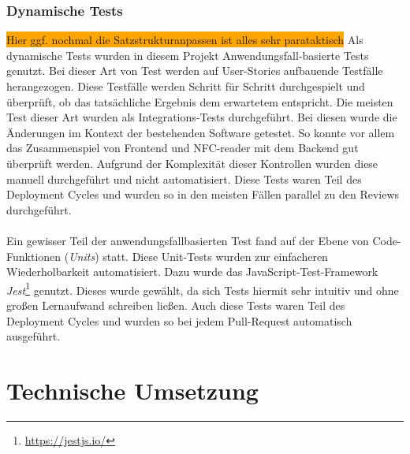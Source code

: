 \documentclass[10pt, a4paper]{article}
\begin{document}
\begin{onehalfspace}
  \subsubsection*{Dynamische Tests}
    \colorbox{orange}{Hier ggf. nochmal die Satzstrukturanpassen ist alles sehr parataktisch}
    Als dynamische Tests wurden in diesem Projekt Anwendungsfall-basierte Tests genutzt.
    Bei dieser Art von Test werden auf User-Stories aufbauende Testfälle herangezogen.
    Diese Testfälle werden Schritt für Schritt \glqq durchgespielt\grqq{} und überprüft, ob das tatsächliche Ergebnis dem erwartetem entspricht.
    Die meisten Test  dieser Art wurden als Integrations-Tests durchgeführt.
    Bei diesen wurde die Änderungen im Kontext der bestehenden Software getestet.
    So konnte vor allem das Zusammenspiel von Frontend und NFC-reader mit dem Backend gut überprüft werden.
    Aufgrund der Komplexität dieser Kontrollen wurden diese manuell durchgeführt und nicht automatisiert.
    Diese Tests waren Teil des Deployment Cycles und wurden so in den meisten Fällen parallel zu den Reviews durchgeführt.
    \\~\\
    Ein gewisser Teil der anwendungsfallbasierten Test fand auf der Ebene von Code-Funktionen (\textit{Units}) statt.
    Diese Unit-Tests wurden zur einfacheren Wiederholbarkeit automatisiert.
    Dazu wurde das JavaScript-Test-Framework \textit{Jest}\footnote{\raggedright\url{https://jestjs.io/}} genutzt.
    Dieses wurde gewählt, da sich Tests hiermit sehr intuitiv und ohne großen Lernaufwand schreiben ließen.
    Auch diese Tests waren Teil des Deployment Cycles und wurden so bei jedem Pull-Request automatisch ausgeführt.

\section{Technische Umsetzung}

\end{onehalfspace}
\end{document}
